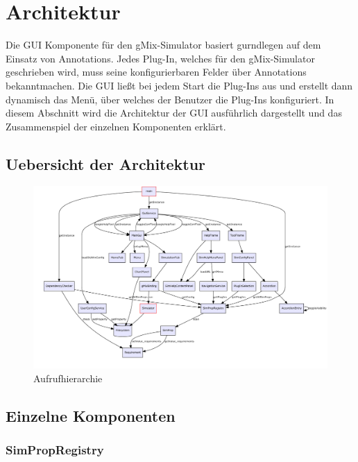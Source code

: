 \documentclass[a4paper, 11pt]{article} %
\begin{document}

\section{Architektur} %
\label{sec:architektur}
Die GUI Komponente für den gMix-Simulator basiert gurndlegen auf dem Einsatz von Annotations. Jedes Plug-In, welches für den gMix-Simulator geschrieben wird, muss seine konfigurierbaren Felder über Annotations bekanntmachen. Die GUI ließt bei jedem Start die Plug-Ins aus und erstellt dann dynamisch das Menü, über welches der Benutzer die Plug-Ins konfiguriert. In diesem Abschnitt wird die Architektur der GUI ausführlich dargestellt und das Zusammenspiel der einzelnen Komponenten erklärt.

\subsection{Uebersicht der Architektur} %
\label{ssub:uebersicht}

\begin{figure}[!htp]
\includegraphics[width=\textwidth]{dot/arch}
\caption{Aufrufhierarchie}
\label{fig:callgraph}
\end{figure}


\subsection{Einzelne Komponenten} %
\label{ssub:einzelne_komponenten}

\subsubsection{SimPropRegistry}
\label{sssub:simpropregistry}
\end{document}
